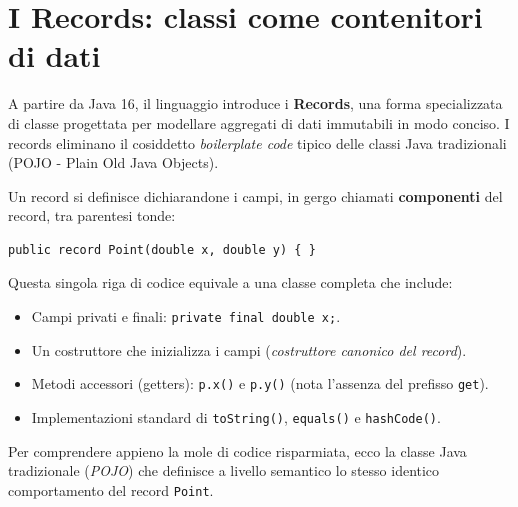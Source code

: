 \section{I Records: classi come contenitori di dati}

A partire da Java 16, il linguaggio introduce i \textbf{Records}, una forma specializzata di classe progettata per modellare aggregati di dati immutabili in modo conciso. I records eliminano il cosiddetto \textit{boilerplate code} tipico delle classi Java tradizionali (POJO - Plain Old Java Objects).

Un record si definisce dichiarandone i campi, in gergo chiamati \textbf{componenti} del record, tra parentesi tonde:
\begin{lstlisting}[caption={Dichiarazione di un Record}]
public record Point(double x, double y) { }
\end{lstlisting}

Questa singola riga di codice equivale a una classe completa che include:
\begin{itemize}
    \item Campi privati e finali: \texttt{private final double x;}.
    \item Un costruttore che inizializza i campi (\textit{costruttore canonico del record}).
    \item Metodi accessori (getters): \texttt{p.x()} e \texttt{p.y()} (nota l'assenza del prefisso \texttt{get}).
    \item Implementazioni standard di \texttt{toString()}, \texttt{equals()} e \texttt{hashCode()}.
\end{itemize}

\medskip

Per comprendere appieno la mole di codice risparmiata, ecco la classe Java tradizionale (\textit{POJO}) che definisce a livello semantico lo stesso identico comportamento del record \texttt{Point}. 


